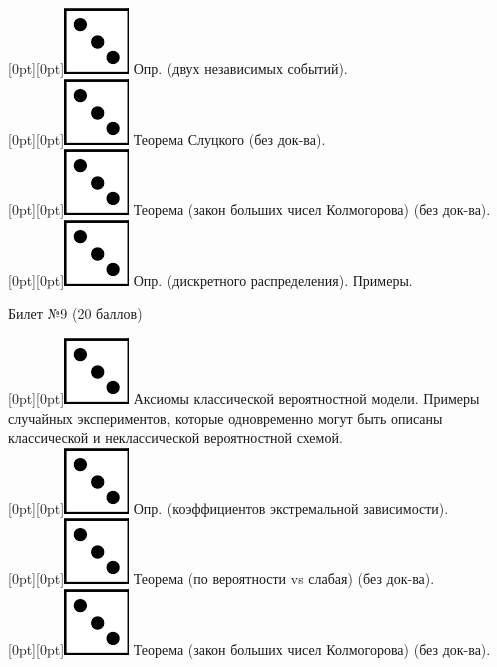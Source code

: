 \documentclass[10pt]{article}
\begin{document}
\raisebox{-1pt}[0pt][0pt]{\includegraphics[width=0.02\linewidth]{3.png}} Опр. (двух независимых событий). \\

\raisebox{-1pt}[0pt][0pt]{\includegraphics[width=0.02\linewidth]{3.png}} Теорема Слуцкого (без док-ва). \\

\raisebox{-1pt}[0pt][0pt]{\includegraphics[width=0.02\linewidth]{3.png}} Теорема (закон больших чисел Колмогорова) (без док-ва). \\

\raisebox{-1pt}[0pt][0pt]{\includegraphics[width=0.02\linewidth]{3.png}} Опр. (дискретного распределения). Примеры. \\

\begin{center} {\Large Билет №9 (20 баллов)} \end{center}

\raisebox{-1pt}[0pt][0pt]{\includegraphics[width=0.02\linewidth]{3.png}} Аксиомы классической вероятностной модели. Примеры случайных экспериментов, которые одновременно могут быть описаны классической и неклассической вероятностной схемой. \\

\raisebox{-1pt}[0pt][0pt]{\includegraphics[width=0.02\linewidth]{3.png}} Опр. (коэффициентов экстремальной зависимости). \\

\raisebox{-1pt}[0pt][0pt]{\includegraphics[width=0.02\linewidth]{3.png}} Теорема (по вероятности vs слабая) (без док-ва). \\  

\raisebox{-1pt}[0pt][0pt]{\includegraphics[width=0.02\linewidth]{3.png}} Теорема (закон больших чисел Колмогорова) (без док-ва). \\
\end{document}
